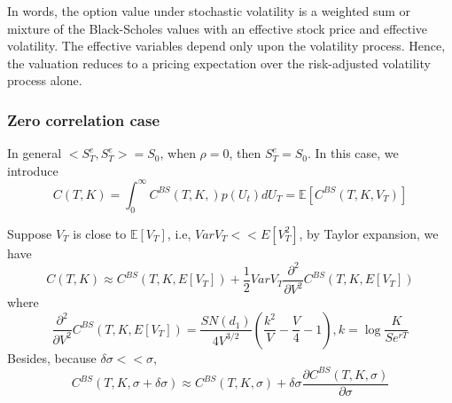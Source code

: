 \documentclass[10pt]{article}
\theoremstyle{plain}
\numberwithin{equation}{section}
\numberwithin{table}{section}
\newcommand{\s}{\sigma}
\newcommand{\prt}[1]{\left( #1 \right)}  %
\newcommand{\de}{\delta}
\newcommand{\pa}{\partial}
\newcommand{\E}{\mathbb{E}}
\begin{document}
In words, the option value under stochastic volatility is a weighted sum or mixture of the
Black-Scholes values with an effective stock price and effective volatility. The effective
variables depend only upon the volatility process. Hence, the valuation reduces to a pricing
expectation over the risk-adjusted volatility process alone. 

\subsubsection{Zero correlation case}
In general $<S^e_T, S^e_T> = S_0$, when $\rho=0$, then $S^e_T=S_0$. In this case, we introduce 
\[
    C(T,K) = \int_0^{\infty} C^{BS}(T, K, ) p(U_t) dU_T = \E [C^{BS}(T, K, V_T)]
\]

Suppose $V_T$ is close to $\E[V_T]$, i.e, $VarV_T << E[V_T^2]$, by Taylor expansion, we have
\[
    C(T,K) \approx C^{BS}(T, K, E[V_T]) + \frac{1}{2} VarV_T \frac{\pa^2}{\pa V^2} C^{BS}(T,K,E[V_T])   
\]
where
\[
    \frac{\pa^2}{\pa V^2} C^{BS}(T,K,E[V_T])  = \frac{SN(d_1)}{4V^{3/2}}\prt{ \frac{k^2}{V} - \frac{V}{4} -1 }, k=\log \frac{K}{Se^{rT}}   
\]
Besides, because $\de \s << \s$,
\[
    C^{BS}(T, K, \s+\de \s) \approx C^{BS}(T, K, \s) + \de \s \frac{\pa C^{BS}(T, K, \s)}{\pa \s}
\]







\begin{appendix}


\end{appendix}
\newpage
\end{document}
